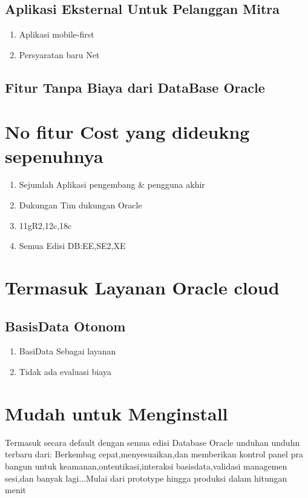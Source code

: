 \documentclass{article}
\begin{document}
\begin{enumerate}
\begin{enumerate}
       \end{enumerate}
\subsection{Aplikasi Eksternal Untuk Pelanggan Mitra}
       \begin{enumerate}
           \item Aplikasi mobile-first
           \item  Persyaratan baru Net
       \end{enumerate}
\subsection{Fitur Tanpa Biaya dari DataBase Oracle}
\section{No fitur Cost yang dideukng sepenuhnya}
    \begin{enumerate}
        \item Sejumlah Aplikasi pengembang & pengguna akhir 
        \item Dukungan Tim dukungan Oracle
        \item 11gR2,12c,18c
        \item Semua Edisi DB:EE,SE2,XE
    \end{enumerate}
\section{Termasuk Layanan Oracle cloud }
\subsection{BasisData Otonom}
    \begin{enumerate}
        \item BasiData Sebagai layanan
        \item Tidak ada evaluasi biaya
    \end{enumerate}
\section{Mudah untuk Menginstall}
 Termasuk secara default dengan semua edisi Database Oracle  
 unduhan unduhn terbaru dari: Berkembag cepat,menyesuaikan,dan memberikan kontrol panel pra bangun untuk keamanan,ontentikasi,interaksi basisdata,validasi managemen sesi,dan banyak lagi...Mulai dari prototype hingga produksi dalam hitungan menit

\end{enumerate}
\end{document}
